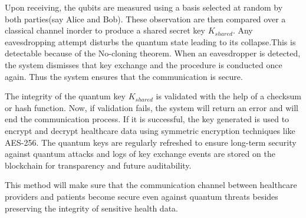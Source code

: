 \documentclass[pdflatex,sn-mathphys-num]{sn-jnl}
\theoremstyle{thmstyleone}%
\theoremstyle{thmstyletwo}%
\theoremstyle{thmstylethree}%
\begin{document}
Upon receiving, the qubits are measured using a basis selected at random by both parties(say Alice and Bob). These observation are then compared over a classical channel inorder to produce a shared secret key \( K_{shared} \)\cite{bib21}. Any eavesdropping attempt disturbs the quantum state leading to its collapse.This is detectable because of the No-cloning theorem\cite{bib11}. When an eavesdropper is detected, the system dismisses that key exchange and the procedure is conducted once again. Thus the system ensures that the communication is secure.

The integrity of the quantum key \( K_{shared} \) is validated with the help of a checksum or hash function. Now, if validation fails, the system will return an error and will end the communication process. If it is successful, the key generated is used to encrypt and decrypt healthcare data using symmetric encryption techniques like AES-256\cite{bib22}. The quantum keys are regularly refreshed to ensure long-term security against quantum attacks and logs of key exchange events are stored on the blockchain for transparency and future auditability.

This method will make sure that the communication channel between healthcare providers and patients become secure even against quantum threats besides preserving the integrity of sensitive health data.




\end{document}
